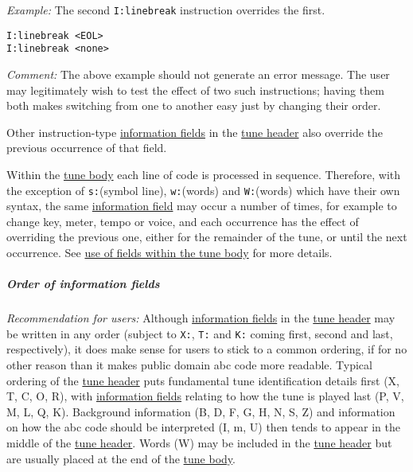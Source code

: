 \emph{Example:} The second \texttt{I:linebreak} instruction overrides
the first.

\begin{verbatim}
I:linebreak <EOL>
I:linebreak <none>
\end{verbatim}

\emph{Comment:} The above example should not generate an error message.
The user may legitimately wish to test the effect of two such
instructions; having them both makes switching from one to another easy
just by changing their order.

Other instruction-type
\protect\hyperlink{information_field_definition}{information fields} in
the \protect\hyperlink{tune_header_definition}{tune header} also
override the previous occurrence of that field.

Within the \protect\hyperlink{tune_body_definition}{tune body} each line
of code is processed in sequence. Therefore, with the exception of
\texttt{s:}(symbol line), \texttt{w:}(words) and \texttt{W:}(words)
which have their own syntax, the same
\protect\hyperlink{information_field_definition}{information field} may
occur a number of times, for example to change key, meter, tempo or
voice, and each occurrence has the effect of overriding the previous
one, either for the remainder of the tune, or until the next occurrence.
See \protect\hyperlink{use_of_fields_within_the_tune_body}{use of fields
within the tune body} for more details.

\subparagraph{Order of information
fields}\label{order_of_information_fields}

\emph{Recommendation for users:} Although
\protect\hyperlink{information_field_definition}{information fields} in
the \protect\hyperlink{tune_header_definition}{tune header} may be
written in any order (subject to \texttt{X:}, \texttt{T:} and
\texttt{K:} coming first, second and last, respectively), it does make
sense for users to stick to a common ordering, if for no other reason
than it makes public domain abc code more readable. Typical ordering of
the \protect\hyperlink{tune_header_definition}{tune header} puts
fundamental tune identification details first (X, T, C, O, R), with
\protect\hyperlink{information_field_definition}{information fields}
relating to how the tune is played last (P, V, M, L, Q, K). Background
information (B, D, F, G, H, N, S, Z) and information on how the abc code
should be interpreted (I, m, U) then tends to appear in the middle of
the \protect\hyperlink{tune_header_definition}{tune header}. Words (W)
may be included in the \protect\hyperlink{tune_header_definition}{tune
header} but are usually placed at the end of the
\protect\hyperlink{tune_body}{tune body}.

